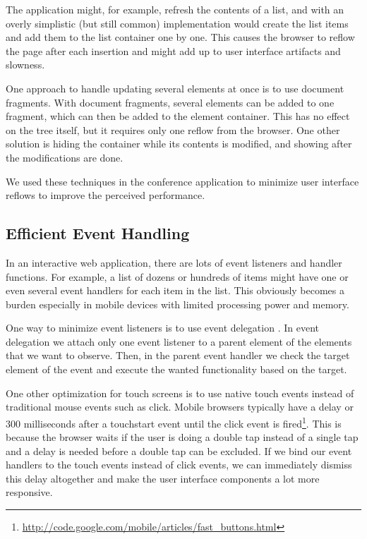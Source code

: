 The application might, for example, refresh the contents of a list,
and with an overly simplistic (but still common) implementation would
create the list items and add them to the list container one by
one. This causes the browser to reflow the page after each insertion
and might add up to user interface artifacts and
slowness. \cite{zakas2010high}

One approach to handle updating several elements at once is to use
document fragments. With document fragments, several elements can be
added to one fragment, which can then be added to the element
container. This has no effect on the  tree itself, but it
requires only one reflow from the browser. One other solution is
hiding the container while its contents is modified, and showing after
the modifications are done. \cite{zakas2010high}

We used these techniques in the conference application to minimize
user interface reflows to improve the perceived performance.

\subsection{Efficient Event Handling}

In an interactive web application, there are lots of event listeners
and handler functions. For example, a list of dozens or hundreds of
items might have one or even several event handlers for each item in
the list. This obviously becomes a burden especially in mobile devices
with limited processing power and memory.

One way to minimize event listeners is to use event delegation
\cite{zakas2010high}. In event delegation we attach only one event
listener to a parent element of the elements that we want to
observe. Then, in the parent event handler we check the target element
of the event and execute the wanted functionality based on the target.

One other optimization for touch screens is to use native touch events
instead of traditional mouse events such as click. Mobile browsers
typically have a delay or 300 milliseconds after a touchstart event
until the click event is
fired\footnote{\url{http://code.google.com/mobile/articles/fast_buttons.html}}. This
is because the browser waits if the user is doing a double tap instead
of a single tap and a delay is needed before a double tap can be
excluded. If we bind our event handlers to the touch events instead of
click events, we can immediately dismiss this delay altogether and
make the user interface components a lot more responsive.

